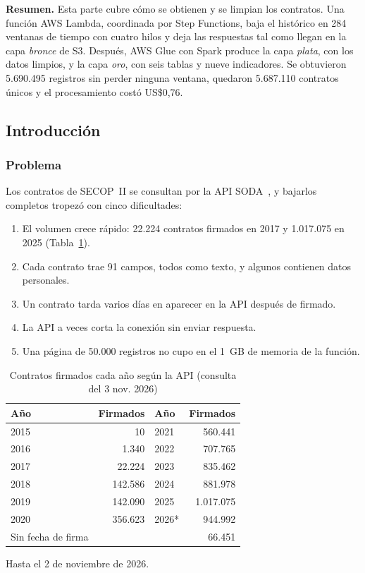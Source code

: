 \noindent\textbf{Resumen.} Esta parte cubre cómo se obtienen y se limpian los contratos. Una función AWS Lambda, coordinada por Step Functions, baja el histórico en 284 ventanas de tiempo con cuatro hilos y deja las respuestas tal como llegan en la capa \emph{bronce} de S3. Después, AWS Glue con Spark produce la capa \emph{plata}, con los datos limpios, y la capa \emph{oro}, con seis tablas y nueve indicadores. Se obtuvieron 5.690.495 registros sin perder ninguna ventana, quedaron 5.687.110 contratos únicos y el procesamiento costó US\$0,76.

\subsection{Introducción}

\subsubsection{Problema}

Los contratos de SECOP~II se consultan por la API SODA~\cite{ancp_secop,tyler_soda}, y bajarlos completos tropezó con cinco dificultades:

\begin{enumerate}
\item El volumen crece rápido: 22.224 contratos firmados en 2017 y 1.017.075 en 2025 (Tabla~\ref{adq:t1}).
\item Cada contrato trae 91 campos, todos como texto, y algunos contienen datos personales.
\item Un contrato tarda varios días en aparecer en la API después de firmado.
\item La API a veces corta la conexión sin enviar respuesta.
\item Una página de 50.000 registros no cupo en el 1~GB de memoria de la función.
\end{enumerate}

\begin{table}[!htbp]
\centering
\small
\caption{Contratos firmados cada año según la API (consulta del 3 nov. 2026)}\label{adq:t1}
\begin{tabular}{lrlr}
\toprule
Año & Firmados & Año & Firmados \\
\midrule
2015 & 10 & 2021 & 560.441 \\
2016 & 1.340 & 2022 & 707.765 \\
2017 & 22.224 & 2023 & 835.462 \\
2018 & 142.586 & 2024 & 881.978 \\
2019 & 142.090 & 2025 & 1.017.075 \\
2020 & 356.623 & 2026* & 944.992 \\
Sin fecha de firma &  &  & 66.451 \\
\bottomrule
\end{tabular}

\smallskip
{\footnotesize * Hasta el 2 de noviembre de 2026.}
\end{table}

